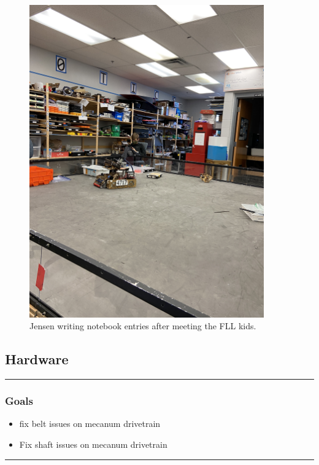 \begin{figure}[htp]
\centering
\includegraphics[width=0.9\textwidth, angle=0]{Meetings/September/09-16-21/IMG_8833 - Falon Jones.JPG}
\caption{Jensen writing notebook entries after meeting the FLL kids.}
\label{fig:pic1}
\end{figure}

\subsection*{Hardware}
\noindent\hfil\rule{\textwidth}{.4pt}\hfil
\subsubsection*{Goals}
\begin{itemize}
    \item fix belt issues on mecanum drivetrain
	\item Fix shaft issues on mecanum drivetrain

\end{itemize} 

\noindent\hfil\rule{\textwidth}{.4pt}\hfil

